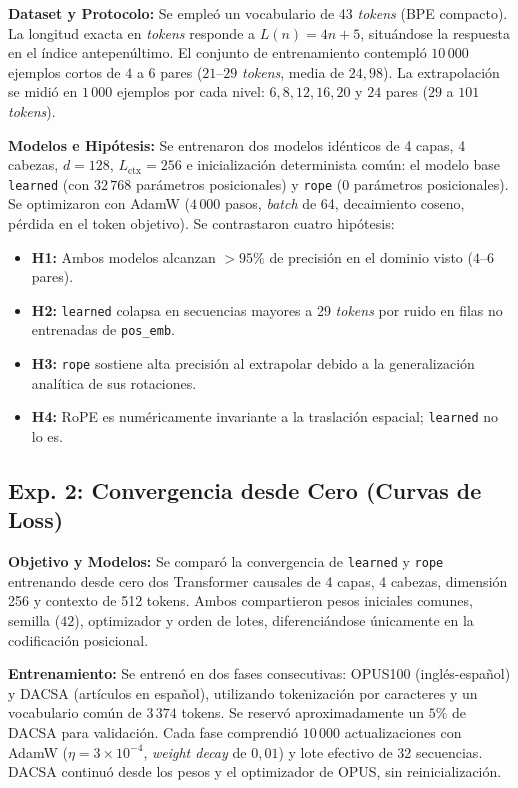 \documentclass[11pt]{article}
\begin{document}
\textbf{Dataset y Protocolo:} Se empleó un vocabulario de 43 \textit{tokens} (BPE compacto). La longitud exacta en \textit{tokens} responde a $L(n) = 4n + 5$, situándose la respuesta en el índice antepenúltimo. El conjunto de entrenamiento contempló $10\,000$ ejemplos cortos de $4$ a $6$ pares ($21$--$29$ \textit{tokens}, media de $24{,}98$). La extrapolación se midió en $1\,000$ ejemplos por cada nivel: $6, 8, 12, 16, 20$ y $24$ pares ($29$ a $101$ \textit{tokens}).

\textbf{Modelos e Hipótesis:} Se entrenaron dos modelos idénticos de 4 capas, 4 cabezas, $d=128$, $L_{\text{ctx}}=256$ e inicialización determinista común: el modelo base \texttt{learned} (con $32\,768$ parámetros posicionales) y \texttt{rope} ($0$ parámetros posicionales). Se optimizaron con AdamW ($4\,000$ pasos, \textit{batch} de 64, decaimiento coseno, pérdida en el token objetivo). Se contrastaron cuatro hipótesis:
\begin{itemize}
    \item \textbf{H1:} Ambos modelos alcanzan $>95\%$ de precisión en el dominio visto ($4$--$6$ pares).
    \item \textbf{H2:} \texttt{learned} colapsa en secuencias mayores a 29 \textit{tokens} por ruido en filas no entrenadas de \texttt{pos\_emb}.
    \item \textbf{H3:} \texttt{rope} sostiene alta precisión al extrapolar debido a la generalización analítica de sus rotaciones.
    \item \textbf{H4:} RoPE es numéricamente invariante a la traslación espacial; \texttt{learned} no lo es.
\end{itemize}

\subsection{Exp. 2: Convergencia desde Cero (Curvas de Loss)}
\textbf{Objetivo y Modelos:} Se comparó la convergencia de \texttt{learned} y \texttt{rope} entrenando desde cero dos Transformer causales de 4 capas, 4 cabezas, dimensión 256 y contexto de 512 tokens. Ambos compartieron pesos iniciales comunes, semilla ($42$), optimizador y orden de lotes, diferenciándose únicamente en la codificación posicional.

\textbf{Entrenamiento:} Se entrenó en dos fases consecutivas: OPUS100 (inglés-español) y DACSA (artículos en español), utilizando tokenización por caracteres y un vocabulario común de $3\,374$ tokens. Se reservó aproximadamente un $5\%$ de DACSA para validación. Cada fase comprendió $10\,000$ actualizaciones con AdamW ($\eta=3\times10^{-4}$, \textit{weight decay} de $0{,}01$) y lote efectivo de 32 secuencias. DACSA continuó desde los pesos y el optimizador de OPUS, sin reinicialización.
\end{document}
